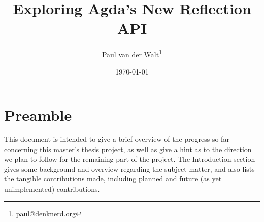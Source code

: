 \documentclass[a4paper]{article}
\author{Paul van der Walt\footnote{\url{paul@denknerd.org}}}
\date{\today}
\title{Exploring Agda's New Reflection API}
\begin{document}
\maketitle


\section{Preamble}

This document is intended to give a brief overview of the progress so far concerning
this master's thesis project, as well as give a hint as to the direction we plan to follow
for the remaining part of the project. The Introduction section gives some background and
overview regarding the subject matter, and also lists
the tangible contributions made, including planned and future (as yet unimplemented) contributions.




{}

\end{document}
